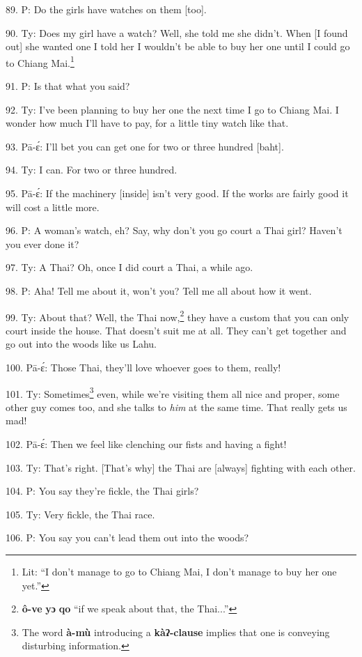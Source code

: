89. P: Do the girls have watches on them [too].

90. Ty: Does my girl have a watch? Well, she told me she didn't. When [I found
out] she wanted one I told her I wouldn't be able to buy her one until I could
go to Chiang Mai.\footnote{Lit: ``I don't manage to go to Chiang Mai, I don't manage to buy her one yet.''}

91. P: Is that what you said?

92. Ty: I've been planning to buy her one the next time I go to Chiang Mai.
I wonder how much I'll have to pay, for a little tiny watch like that.

93. Pā-ɛ́: I'll bet you can get one for two or three hundred [baht].

94. Ty: I can. For two or three hundred.

95. Pā-ɛ́: If the machinery [inside] isn't very good. If the works are fairly
good it will cost a little more.

96. P: A woman's watch, eh? Say, why don't you go court a Thai girl? Haven't
you ever done it?

97. Ty: A Thai? Oh, once I did court a Thai, a while ago.

98. P: Aha! Tell me about it, won't you? Tell me all about how it went.

99. Ty: About that? Well, the Thai now,\footnote{\textbf{ô-ve} \textbf{yɔ} \textbf{qo} ``if we speak about that, the Thai...''} they have a custom that you can
only court inside the house. That doesn't suit me at all. They can't get together
and go out into the woods like us Lahu.

100. Pā-ɛ́: Those Thai, they'll love whoever goes to them, really!

101. Ty: Sometimes\footnote{The word \textbf{à-mù} introducing a \textbf{kàʔ-clause} implies that one is conveying disturbing information.} even, while we're visiting them all nice and proper,
some other guy comes too, and she talks to \textit{him} at the same time. That
really gets us mad!

102. Pā-ɛ́: Then we feel like clenching our fists and having a fight!

103. Ty: That's right. [That's why] the Thai are [always] fighting with each
other.

104. P: You say they're fickle, the Thai girls?

105. Ty: Very fickle, the Thai race.

106. P: You say you can't lead them out into the woods?

